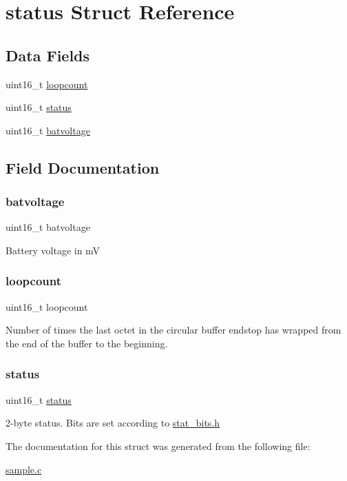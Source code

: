 \hypertarget{structstatus}{}\section{status Struct Reference}
\label{structstatus}
\subsection*{Data Fields}
\begin{DoxyCompactItemize}
\item 
uint16\+\_\+t \mbox{\hyperlink{structstatus_ad6771c066dbc9a3f9c97f67d183dafe4}{loopcount}}
\item 
uint16\+\_\+t \mbox{\hyperlink{structstatus_a5393c99e246925076b1dfd69a64177ef}{status}}
\item 
uint16\+\_\+t \mbox{\hyperlink{structstatus_a64bf6569e5dcde7c63303ca7557c4ce9}{batvoltage}}
\end{DoxyCompactItemize}


\subsection{Field Documentation}
\mbox{\label{structstatus_a64bf6569e5dcde7c63303ca7557c4ce9}} 
\subsubsection{\texorpdfstring{batvoltage}{batvoltage}}
{\footnotesize\ttfamily uint16\+\_\+t batvoltage}

Battery voltage in mV \mbox{\label{structstatus_ad6771c066dbc9a3f9c97f67d183dafe4}} 
\subsubsection{\texorpdfstring{loopcount}{loopcount}}
{\footnotesize\ttfamily uint16\+\_\+t loopcount}

Number of times the last octet in the circular buffer endstop has wrapped from the end of the buffer to the beginning. \mbox{\label{structstatus_a5393c99e246925076b1dfd69a64177ef}} 
\subsubsection{\texorpdfstring{status}{status}}
{\footnotesize\ttfamily uint16\+\_\+t \mbox{\hyperlink{structstatus}{status}}}

2-\/byte status. Bits are set according to \mbox{\hyperlink{stat__bits_8h}{stat\+\_\+bits.\+h}} 

The documentation for this struct was generated from the following file\+:\begin{DoxyCompactItemize}
\item 
\mbox{\hyperlink{sample_8c}{sample.\+c}}\end{DoxyCompactItemize}
